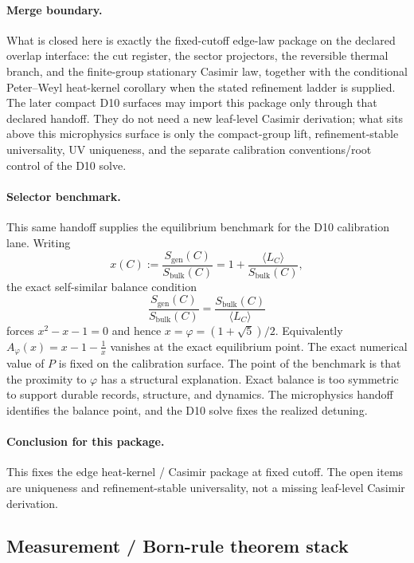 \documentclass[11pt]{article}
\begin{document}
\paragraph{Merge boundary.}
What is closed here is exactly the fixed-cutoff edge-law package on the declared overlap
interface: the cut register, the sector projectors, the reversible thermal branch, and the
finite-group stationary Casimir law, together with the conditional Peter--Weyl heat-kernel
corollary when the stated refinement ladder is supplied. The later compact D10 surfaces may
import this package only through that declared handoff. They do not need a new leaf-level
Casimir derivation; what sits above this microphysics surface is only the compact-group lift,
refinement-stable universality, UV uniqueness, and the separate calibration conventions/root
control of the D10 solve.

\paragraph{Selector benchmark.}
This same handoff supplies the equilibrium benchmark for the D10 calibration lane. Writing
\[
x(C):=\frac{S_{\mathrm{gen}}(C)}{S_{\mathrm{bulk}}(C)}
=
1+\frac{\langle L_C\rangle}{S_{\mathrm{bulk}}(C)},
\]
the exact self-similar balance condition
\[
\frac{S_{\mathrm{gen}}(C)}{S_{\mathrm{bulk}}(C)}
=
\frac{S_{\mathrm{bulk}}(C)}{\langle L_C\rangle}
\]
forces \(x^2-x-1=0\) and hence \(x=\varphi=(1+\sqrt5)/2\). Equivalently
\(A_\varphi(x)=x-1-\frac1x\) vanishes at the exact equilibrium point. The exact numerical value of
\(P\) is fixed on the calibration surface. The point of the benchmark is that the proximity to
\(\varphi\) has a structural explanation. Exact balance is too symmetric to support durable
records, structure, and dynamics. The microphysics handoff identifies the balance point, and the
D10 solve fixes the realized detuning.

\paragraph{Conclusion for this package.}
This fixes the edge heat-kernel / Casimir package at fixed cutoff. The open items are uniqueness and refinement-stable universality, not a missing leaf-level Casimir derivation.

\subsection{Measurement / Born-rule theorem stack}
\end{document}
